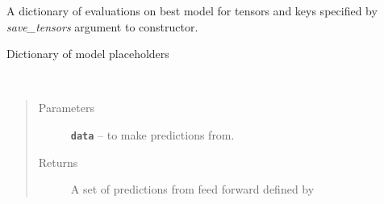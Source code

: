 \documentclass[letterpaper,10pt,english]{sphinxmanual}
\begin{document}
\begin{fulllineitems}
\begin{fulllineitems}
\begin{quote}
\begin{description}
\end{description}\end{quote}

\end{fulllineitems}


\begin{fulllineitems}
\label{generic_model:generic_model.Model.evaluated_tensors}
A dictionary of evaluations on best model for tensors and keys specified by \emph{save\_tensors} argument to constructor.

\end{fulllineitems}


\begin{fulllineitems}
\label{generic_model:generic_model.Model.placeholderdict}
Dictionary of model placeholders

\end{fulllineitems}


\begin{fulllineitems}
\label{generic_model:generic_model.Model.plot_train_dev_eval}
\end{fulllineitems}


\begin{fulllineitems}
\label{generic_model:generic_model.Model.predict}~\begin{quote}\begin{description}
\item[{Parameters}] \leavevmode
\textbf{\texttt{data}} -- {\hyperref[loader:loader.DataSet]{\emph{}}} to make predictions from.

\item[{Returns}] \leavevmode
A set of predictions from feed forward defined by 

\end{description}\end{quote}


\end{fulllineitems}
\end{fulllineitems}
\end{document}
